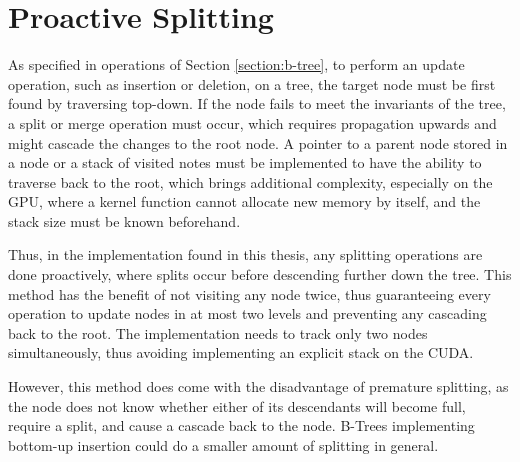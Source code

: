 \section{Proactive Splitting}

As specified in operations of Section \ref{section:b-tree}, to perform an update operation, such as insertion or deletion, on a tree, the target node must be first found by traversing top-down. If the node fails to meet the invariants of the tree, a split or merge operation must occur, which requires propagation upwards and might cascade the changes to the root node. A pointer to a parent node stored in a node or a stack of visited notes must be implemented to have the ability to traverse back to the root, which brings additional complexity, especially on the GPU, where a kernel function cannot allocate new memory by itself, and the stack size must be known beforehand.

Thus, in the implementation found in this thesis, any splitting operations are done proactively, where splits occur before descending further down the tree. This method has the benefit of not visiting any node twice, thus guaranteeing every operation to update nodes in at most two levels and preventing any cascading back to the root. The implementation needs to track only two nodes simultaneously, thus avoiding implementing an explicit stack on the CUDA.

However, this method does come with the disadvantage of premature splitting, as the node does not know whether either of its descendants will become full, require a split, and cause a cascade back to the node. B-Trees implementing bottom-up insertion could do a smaller amount of splitting in general.
